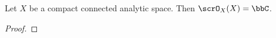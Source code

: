 \begin{proposition}
	Let $X$ be a compact connected analytic space.
	Then $\scrO_X(X) = \bbC$.
\end{proposition}
\begin{proof}
	\Yang{}
\end{proof}



\begin{definition}
\end{definition}






